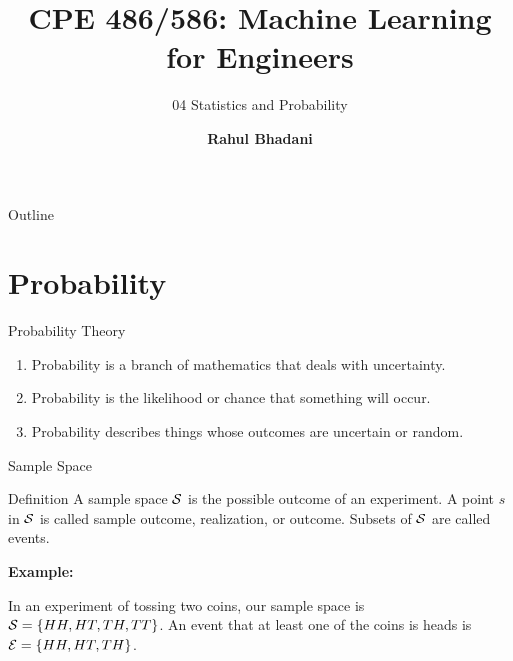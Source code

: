 \documentclass[aspectratio=169,xcolor=dvipsnames,svgnames,x11names,fleqn]{beamer}
\title[CPE 486/586: Machine Learning]{CPE 486/586: Machine Learning for Engineers} %
\subtitle{04 Statistics and Probability}
\author[Rahul Bhadani] {{\Large \textbf{Rahul Bhadani}}}
\institute[UAH] %
{
    Electrical \& Computer Engineering,  The University of Alabama in Huntsville
}
\date
\begin{document}
\begin{frame}
    \titlepage
\end{frame}

\begin{frame}{Outline}
    \backgroundtableofcontents
\end{frame}

\section{Probability}

\begin{frame}
    \sectionpage
\end{frame}





\begin{frame}[containsverbatim]{Probability Theory}
    \begin{enumerate}
        \item Probability is a branch of mathematics that deals with uncertainty.
        \item Probability is the likelihood or chance that something will occur. 
        \item Probability describes things whose outcomes are uncertain or random.
        
    \end{enumerate}
    \end{frame}
    
    
    \begin{frame}[containsverbatim]{Sample Space}
    \begin{tblock}{Definition}
        A sample space ${\mathcal S}$ is the possible outcome of an experiment. A point $s$ in ${\mathcal S}$ is called sample outcome, realization, or outcome. Subsets of ${\mathcal S}$ are called events. 
        
        \textbf{Example: }
    
        In an experiment of tossing two coins, our sample space is ${\mathcal S} = \{HH, HT, TH, TT\}$. An event that at least one of the coins is heads is ${\mathcal E} = \{HH, HT, TH\}$.
    \end{tblock}
    \end{frame}
    
    
\end{document}
